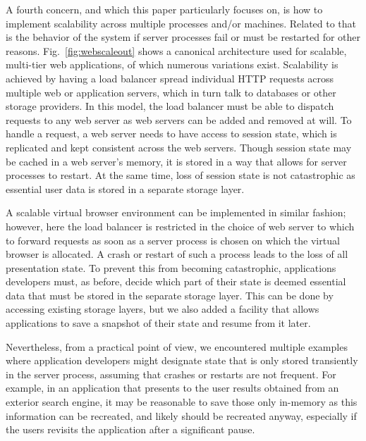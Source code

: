 A fourth concern, and which this paper particularly focuses on, is how to implement
scalability across multiple processes and/or machines. Related to that is the 
behavior of the system if server processes fail or must be restarted for other reasons.
Fig.~\ref{fig:webscaleout} shows a canonical architecture used for scalable, multi-tier web 
applications, of which numerous variations exist.  Scalability is achieved
by having a load balancer spread individual HTTP requests across multiple
web or application servers, which in turn talk to databases or other storage
providers.  In this model, the load balancer must be able to dispatch requests 
to any web server as web servers can be added and removed at will. To handle a 
request, a web server needs to have access to session state, which is replicated
and kept consistent across the web servers.  Though session state may be cached
in a web server's memory, it is stored in a way that allows for server processes
to restart.  At the same time, loss of session state is not catastrophic
as essential user data is stored in a separate storage layer.

A scalable virtual browser environment can be implemented in similar fashion;
however, here the load balancer is restricted in the choice of web server to 
which to forward requests as soon as a server process is chosen on which the
virtual browser is allocated.  A crash or restart of such a process leads
to the loss of all presentation state.  To prevent this from becoming 
catastrophic, applications developers must, as before, decide which part of their
state is deemed essential data that must be stored in the separate storage
layer.  This can be done by accessing existing storage layers,
but we also added a facility that allows applications to save a snapshot
of their state and resume from it later.

Nevertheless, from a practical point of view, we encountered multiple
examples where application developers might designate state that is only
stored transiently in the server process, assuming that crashes or restarts
are not frequent.  For example, in an application that presents to the
user results obtained from an exterior search engine, it may be reasonable
to save those only in-memory as this information can be recreated, and likely
should be recreated anyway, especially if the users revisits the application
after a significant pause.

